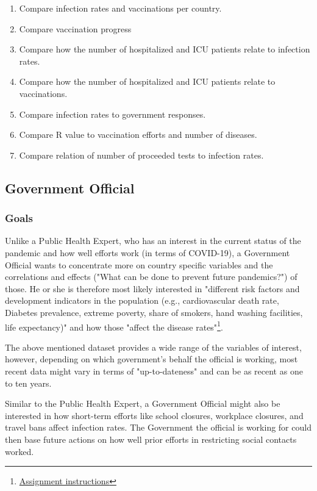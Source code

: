 \documentclass[11pt]{article}
\begin{document}
\begin{enumerate}[leftmargin=*, labelindent=1.5em, label={PH\arabic*.}]
  \item Compare infection rates and vaccinations per country.
  \item Compare vaccination progress
  \item Compare how the number of hospitalized and ICU patients relate to infection rates.
  \item Compare how the number of hospitalized and ICU patients relate to vaccinations.
  \item Compare infection rates to government responses.
  \item Compare R value to vaccination efforts and number of diseases.
  \item Compare relation of number of proceeded tests to infection rates.
\end{enumerate}

\subsection{Government Official}
\subsubsection{Goals}
Unlike a Public Health Expert, who has an interest in the current status of the pandemic and how well efforts work (in terms of COVID-19), 
a Government Official wants to concentrate more on country specific 
variables and the correlations and effects ("What can be done to prevent future pandemics?") of those. 
He or she is therefore most likely interested in "different risk factors and development indicators in the 
population (e.g., cardiovascular death rate, Diabetes prevalence, extreme poverty, share of smokers, hand washing facilities, life expectancy)" and how those 
"affect the disease rates"\footnote{\href{http://vda.univie.ac.at/Teaching/Vis/21w/a4.html}{Assignment instructions}}.

The above mentioned dataset provides a wide range of the variables of interest, however, depending on which government's behalf the official is working, most 
recent data might vary in terms of "up-to-dateness" and can be as recent as one to ten years.

Similar to the Public Health Expert, a Government Official might also be interested in how short-term efforts like school closures, workplace closures, and travel bans affect 
infection rates. The Government the official is working for could then base future actions on how well prior efforts in restricting social contacts worked.
\end{document}
